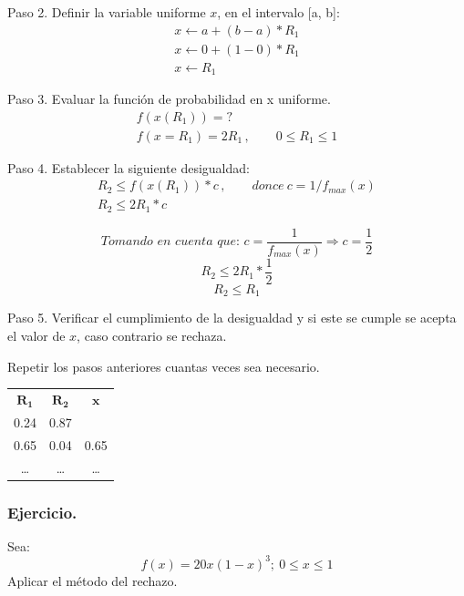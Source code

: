 \documentclass[11pt,letterpaper]{report}
\begin{document}
Paso 2. Definir la variable uniforme $x$, en el intervalo [a, b]:
\begin{gather*}
x \leftarrow a + (b - a) * R_1\\
x \leftarrow 0 + (1 - 0) * R_1\\
x \leftarrow R_1
\end{gather*}

Paso 3. Evaluar la función de probabilidad en x uniforme.
\begin{gather*}
f(x(R_1)) = ?\\
f(x = R_1) = 2R_1\,,\qquad 0 \leq R_1 \leq 1
\end{gather*}

Paso 4. Establecer la siguiente desigualdad:
\begin{gather*}
R_2 \leq f(x(R_1)) * c\,,\qquad donce\ c = 1/f_{max}(x)\\
R_2 \leq 2R_1 * c
\end{gather*}

\begin{center}
\end{center}

\[
\textit{Tomando en cuenta que: } c = \frac{1}{f_{max}(x)} \Rightarrow c = \frac{1}{2}
\]
\[
R_2 \leq 2R_1 * \frac{1}{2}
\]
\[
\boxed{R_2 \leq R_1}
\]

Paso 5. Verificar el cumplimiento de la desigualdad y si este se cumple se acepta el valor de $x$, caso contrario se rechaza.

\qquad Repetir los pasos anteriores cuantas veces sea necesario.

\begin{table}[H]
\centering
\begin{tabular}{ccc}
$\boldsymbol{R_1}$ & $\boldsymbol{R_2}$ & $\boldsymbol{x}$\\
0.24 & 0.87 & \\
0.65 & 0.04 & 0.65\\
\ldots & \ldots & \ldots
\end{tabular}
\end{table}

\subsubsection*{Ejercicio.}

Sea:
\[
f(x) = 20x(1-x)^3;\ 0 \leq x \leq 1
\]
Aplicar el método del rechazo.
\end{document}
